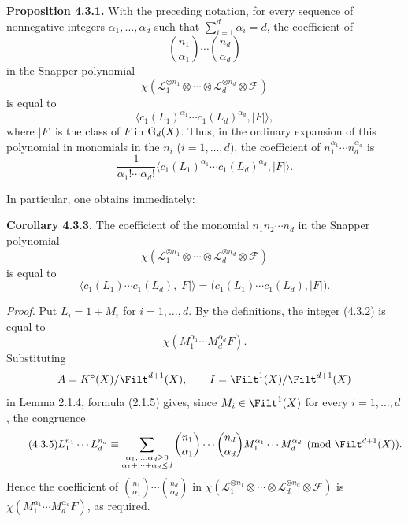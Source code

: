 \textbf{Proposition 4.3.1.}
With the preceding notation, for every sequence of nonnegative integers
$\alpha_1,\ldots,\alpha_d$ such that
$\sum_{i=1}^d\alpha_i=d$, the coefficient of
\[
\binom{n_1}{\alpha_1}\cdots\binom{n_d}{\alpha_d}
\]
in the Snapper polynomial
\[
\chi(\mathcal L_1^{\otimes n_1}\otimes\cdots\otimes
\mathcal L_d^{\otimes n_d}\otimes\mathcal F)
\]
is equal to
\begin{equation}\tag{4.3.2}
\bigl\langle c_1(L_1)^{\alpha_1}\cdots
c_1(L_d)^{\alpha_d},\lvert F\rvert\bigr\rangle,
\end{equation}
where $\lvert F\rvert$ is the class of $F$ in $\operatorname{G}_d(X)$. Thus, in the ordinary
expansion of this polynomial in monomials in the $n_i$ ($i=1,\ldots,d$),
the coefficient of $n_1^{\alpha_1}\cdots n_d^{\alpha_d}$ is
\[
\frac{1}{\alpha_1!\cdots\alpha_d!}
\bigl\langle c_1(L_1)^{\alpha_1}\cdots
c_1(L_d)^{\alpha_d},\lvert F\rvert\bigr\rangle.
\]

In particular, one obtains immediately:

\textbf{Corollary 4.3.3.}
The coefficient of the monomial $n_1n_2\cdots n_d$ in the Snapper polynomial
\[
\chi(\mathcal L_1^{\otimes n_1}\otimes\cdots\otimes
\mathcal L_d^{\otimes n_d}\otimes\mathcal F)
\]
is equal to
\begin{equation}\tag{4.3.4}
\bigl\langle c_1(L_1)\cdots c_1(L_d),\lvert F\rvert\bigr\rangle
=\bigl(c_1(L_1)\cdots c_1(L_d),\lvert F\rvert\bigr).
\end{equation}

\emph{Proof.}
Put $L_i=1+M_i$ for $i=1,\ldots,d$. By the definitions, the integer (4.3.2)
is equal to
\[
\chi(M_1^{\alpha_1}\cdots M_d^{\alpha_d}F).
\]
Substituting
\[
A=K^\circ(X)/\Filt^{d+1}(X),
\qquad I=\Filt^1(X)/\Filt^{d+1}(X)
\]
in Lemma 2.1.4, formula (2.1.5) gives, since
$M_i\in\Filt^1(X)$ for every $i=1,\ldots,d$, the congruence
\begin{equation}\tag{4.3.5}
L_1^{n_1}\cdots L_d^{n_d}\equiv
\sum_{\substack{\alpha_1,\ldots,\alpha_d\geq0\\
\alpha_1+\cdots+\alpha_d\leq d}}
\binom{n_1}{\alpha_1}\cdots\binom{n_d}{\alpha_d}
M_1^{\alpha_1}\cdots M_d^{\alpha_d}
\pmod{\Filt^{d+1}(X)}.
\end{equation}
Hence the coefficient of
$\binom{n_1}{\alpha_1}\cdots\binom{n_d}{\alpha_d}$ in
$\chi(\mathcal L_1^{\otimes n_1}\otimes\cdots\otimes
\mathcal L_d^{\otimes n_d}\otimes\mathcal F)$ is
$\chi(M_1^{\alpha_1}\cdots M_d^{\alpha_d}F)$, as required.

